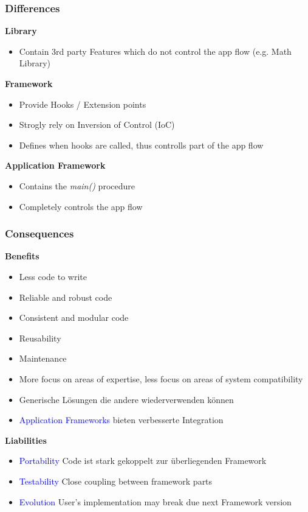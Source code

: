 \subsubsection{Differences}
\textbf{Library}
\begin{itemize}
    \item Contain 3rd party Features which do not control the app flow (e.g. Math Library)
\end{itemize}
\vspace{10pt}
\textbf{Framework}
\begin{itemize}
    \item Provide Hooks / Extension points
    \item Strogly rely on Inversion of Control (IoC)
    \item Defines when hooks are called, thus controlls part of the app flow
\end{itemize}
\vspace{10pt}
\textbf{Application Framework}
\begin{itemize}
    \item Contains the \textit{main()} procedure
    \item Completely controls the app flow
\end{itemize}

\subsubsection{Consequences}

\textbf{Benefits}

\begin{itemize}
    \item Less code to write
    \item Reliable and robust code
    \item Consistent and modular code
    \item Reusability
    \item Maintenance
    \item More focus on areas of expertise, less focus on areas of system compatibility
    \item Generische Lösungen die andere wiederverwenden können
    \item \textcolor{blue}{Application Frameworks} bieten verbesserte Integration
\end{itemize}
\vspace{10pt}
\textbf{Liabilities}

\begin{itemize}
    \item \textcolor{blue}{Portability} Code ist stark gekoppelt zur überliegenden Framework
    \item \textcolor{blue}{Testability} Close coupling between framework parts
    \item \textcolor{blue}{Evolution} User's implementation may break due next
    Framework version
\end{itemize}



